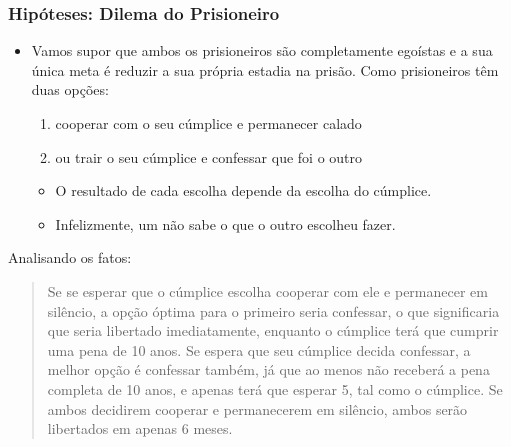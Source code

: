 \begin{frame}

    \frametitle{Hipóteses: Dilema do Prisioneiro}
    
    
    \begin{itemize}
      \item  Vamos supor que ambos os prisioneiros são completamente egoístas e a sua única meta é reduzir a sua própria estadia na prisão. Como prisioneiros têm duas opções:
      
      \begin{enumerate}
         \item cooperar com o seu cúmplice e permanecer calado
         \item ou trair o seu cúmplice e confessar que foi o outro
       \end{enumerate}   
       
       \begin{itemize}
         \item   O resultado de cada escolha depende da escolha do cúmplice.     
         \item Infelizmente, um não sabe o que o outro escolheu fazer. 
       \end{itemize}
      

    
    
    
    \end{itemize}

Analisando os fatos:

\begin{small}
\begin{quotation}
Se se esperar que o cúmplice escolha cooperar com ele e permanecer em silêncio, a opção óptima para o primeiro seria confessar, o que significaria que seria libertado imediatamente, enquanto o cúmplice terá que cumprir uma pena de 10 anos. Se espera que seu cúmplice decida confessar, a melhor opção é confessar também, já que ao menos não receberá a pena completa de 10 anos, e apenas terá que esperar 5, tal como o cúmplice. Se ambos decidirem cooperar e permanecerem em silêncio, ambos serão libertados em apenas 6 meses.
\end{quotation}
\end{small}

\end{frame}



